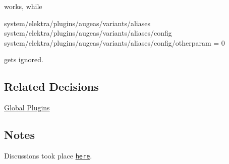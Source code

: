 works, while


\begin{DoxyCode}
system/elektra/plugins/augeas/variants/aliases
system/elektra/plugins/augeas/variants/aliases/config
system/elektra/plugins/augeas/variants/aliases/config/otherparam = 0
\end{DoxyCode}


gets ignored.

\subsection*{Related Decisions}


\begin{DoxyItemize}
\item \hyperlink{doc_decisions_global_plugins_md}{Global Plugins}
\end{DoxyItemize}

\subsection*{Notes}

Discussions took place \href{https://git.libelektra.org/issues/1006}{\tt here}. 